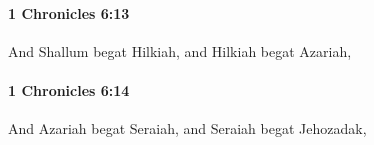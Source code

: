 		\paragraph{1 Chronicles 6:13} %
			\label{1CHRONICLES-6-13}

			And Shallum begat Hilkiah, and Hilkiah begat Azariah,


		\paragraph{1 Chronicles 6:14} %
			\label{1CHRONICLES-6-14}

			And Azariah begat Seraiah, and Seraiah begat Jehozadak,


